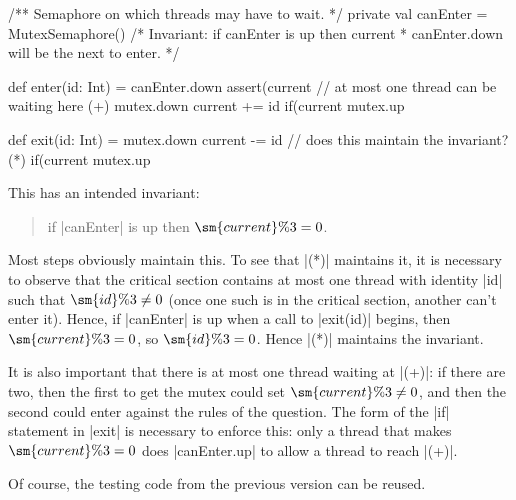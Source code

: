 \begin{answer}
\begin{scala}
{  /** Semaphore on which threads may have to wait. */
  private val canEnter = MutexSemaphore()
  /* Invariant: if canEnter is up then current%
   * canEnter.down will be the next to enter. */

  def enter(id: Int) = {
    canEnter.down 
    assert(current%
    // at most one thread can be waiting here (+)
    mutex.down
    current += id
    if(current%
    mutex.up
  }

  def exit(id: Int) = {
    mutex.down
    current -= id // does this maintain the invariant? (*)
    if(current%
    mutex.up
  }
}
\end{scala}
%
This has an intended invariant:
\begin{quote}
 if |canEnter| is up then $\sm{current}\%3 = 0$.
\end{quote}
Most steps obviously maintain this.  To see that |(*)| maintains it, it is
necessary to observe that the critical section contains at most one thread
with identity |id| such that $\sm{id} \% 3 \ne 0$ (once one such is in the
critical section, another can't enter it).  Hence, if |canEnter| is up when a
call to |exit(id)| begins, then $\sm{current}\%3 = 0$, so $\sm{id} \% 3 = 0$.
Hence |(*)| maintains the invariant.

It is also important that there is at most one thread waiting at |(+)|: if
there are two, then the first to get the mutex could set $\sm{current}\%3 \ne
0$, and then the second could enter against the rules of the question.  The
form of the |if| statement in |exit| is necessary to enforce this: only a
thread that makes $\sm{current}\%3 = 0$ does  |canEnter.up| to allow a
thread to reach |(+)|.

Of course, the testing code from the previous version can be reused.
\end{answer}
